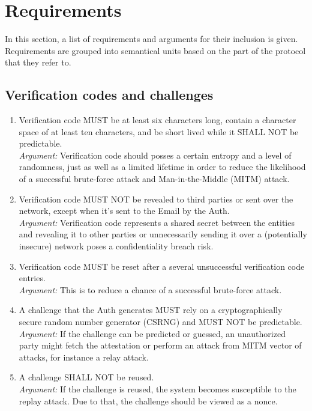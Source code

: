 \section{Requirements}
In this section, a list of requirements and arguments for their inclusion is given. Requirements are grouped into 
semantical units based on the part of the protocol that they refer to.

    \subsection{Verification codes and challenges}
        \begin{enumerate}
            \item Verification code MUST be at least six characters long, contain a character space of at 
                  least ten characters, and be short lived while it SHALL NOT be predictable.\\    
            \textit{Argument:} Verification code should posses a certain entropy and a level of randomness, 
                               just as well as a limited lifetime in order to reduce  the likelihood of a 
                               successful brute-force attack and Man-in-the-Middle (MITM) attack.

            \item Verification code MUST NOT be revealed to third parties or sent over the network, 
                  except when it's sent to the Email by the Auth.\\        
            \textit{Argument:} Verification code represents a shared secret between the entities and revealing 
                               it to other parties or unnecessarily sending it over a (potentially insecure) 
                               network poses a confidentiality breach risk.

            \item Verification code MUST be reset after a several unsuccessful verification code entries.\\        
            \textit{Argument:} This is to reduce a chance of a successful brute-force attack.

            \item A challenge that the Auth generates MUST rely on a cryptographically secure random number 
                  generator (CSRNG) and MUST NOT be predictable.\\
            \textit{Argument:} If the challenge can be predicted or guessed, an unauthorized party might fetch the
                               attestation or perform an attack from MITM vector of attacks, for instance a relay 
                               attack.

            \item A challenge SHALL NOT be reused.\\
            \textit{Argument:} If the challenge is reused, the system becomes susceptible to the replay attack. 
                               Due to that, the challenge should be viewed as a nonce.
        \end{enumerate}

